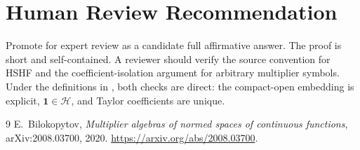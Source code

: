 \documentclass[11pt]{article}
\theoremstyle{definition}
\theoremstyle{remark}
\newcommand{\Hcal}{\mathcal H}
\begin{document}
\section*{Human Review Recommendation}

Promote for expert review as a candidate full affirmative answer.  The proof
is short and self-contained.  A reviewer should verify the source convention
for HSHF and the coefficient-isolation argument for arbitrary multiplier
symbols.  Under the definitions in \cite{Bilokopytov2020}, both checks are
direct: the compact-open embedding is explicit, $\mathbf1\in\Hcal$, and
Taylor coefficients are unique.

\begin{thebibliography}{9}
E.~Bilokopytov,
\emph{Multiplier algebras of normed spaces of continuous functions},
arXiv:2008.03700, 2020.
\url{https://arxiv.org/abs/2008.03700}.
\end{thebibliography}
\end{document}
